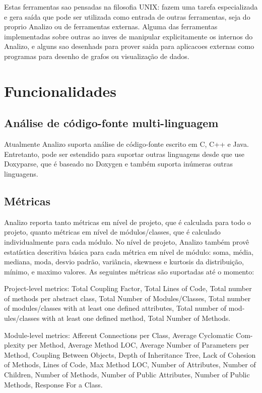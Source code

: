 \documentclass{article}
\begin{document}
Estas ferramentas sao pensadas na filosofia UNIX: fazem uma tarefa especializada e gera saída
que pode ser utilizada como entrada de outras ferramentas, seja do proprio Analizo ou de ferramentas
externas. Alguma das ferramentas implementadas sobre outras ao inves de manipular explicitamente
os internos do Analizo, e alguns sao desenhads para prover saida para aplicacoes externas como 
programas para desenho de grafos ou visualização de dados.

\section{Funcionalidades}

\subsection{Análise de código-fonte multi-linguagem}

Atualmente Analizo suporta análise de código-fonte escrito em C, C++ e Java. Entretanto,
pode ser estendido para suportar outras linguagens desde que use Doxyparse, que é baseado
no Doxygen e também suporta inúmeras outras linguagens.

\subsection{Métricas}

Analizo reporta tanto métricas em nível de projeto, que é calculada para todo o projeto,
quanto métricas em nível de módulos/classes, que é calculado individualmente para cada módulo.
No nível de projeto, Analizo também provê estatística descritiva básica para cada métrica em
nível de módulo: soma, média, mediana, moda, desvio padrão, variância, skewness e kurtosis da
distribuição, mínimo, e maximo valores. As seguintes métricas são suportadas até o momento:

Project-level metrics: Total Coupling Factor, Total Lines of Code, Total number
of methods per abstract class, Total Number of Modules/Classes, Total number
of modules/classes with at least one defined attributes, Total number of mod-
ules/classes with at least one defined method, Total Number of Methods.

Module-level metrics: Afferent Connections per Class, Average Cyclomatic Com-
plexity per Method, Average Method LOC, Average Number of Parameters per
Method, Coupling Between Objects, Depth of Inheritance Tree, Lack of Cohesion
of Methods, Lines of Code, Max Method LOC, Number of Attributes, Number of
Children, Number of Methods, Number of Public Attributes, Number of Public
Methods, Response For a Class.
\end{document}
